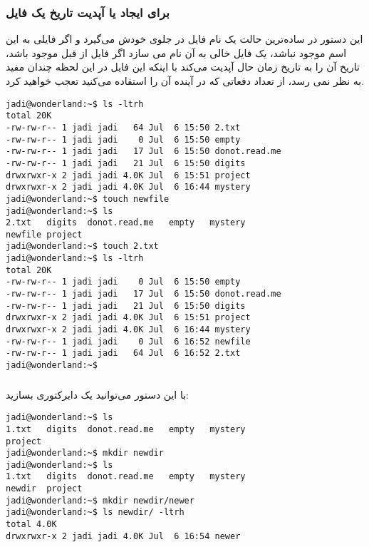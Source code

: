 \subsubsection*{ برای ایجاد یا آپدیت تاریخ یک فایل}
این دستور در ساده‌ترین حالت یک نام فایل در جلوی خودش می‌گیرد و
اگر فایلی به این اسم موجود نباشد، یک فایل خالی به آن نام می سازد
اگر فایل از قبل موجود باشد، تاریخ آن را به تاریخ زمان حال آپدیت می‌کند
با اینکه این فایل در این لحظه چندان مفید به نظر نمی رسد، از تعداد دفعاتی که در آینده آن را استفاده می‌کنید تعجب خواهید کرد.
\begin{frameng}
\begin{lstlisting}
jadi@wonderland:~$ ls -ltrh
total 20K
-rw-rw-r-- 1 jadi jadi   64 Jul  6 15:50 2.txt
-rw-rw-r-- 1 jadi jadi    0 Jul  6 15:50 empty
-rw-rw-r-- 1 jadi jadi   17 Jul  6 15:50 donot.read.me
-rw-rw-r-- 1 jadi jadi   21 Jul  6 15:50 digits
drwxrwxr-x 2 jadi jadi 4.0K Jul  6 15:51 project
drwxrwxr-x 2 jadi jadi 4.0K Jul  6 16:44 mystery
jadi@wonderland:~$ touch newfile
jadi@wonderland:~$ ls
2.txt	digits	donot.read.me	empty	mystery
newfile	project
jadi@wonderland:~$ touch 2.txt 
jadi@wonderland:~$ ls -ltrh
total 20K
-rw-rw-r-- 1 jadi jadi    0 Jul  6 15:50 empty
-rw-rw-r-- 1 jadi jadi   17 Jul  6 15:50 donot.read.me
-rw-rw-r-- 1 jadi jadi   21 Jul  6 15:50 digits
drwxrwxr-x 2 jadi jadi 4.0K Jul  6 15:51 project
drwxrwxr-x 2 jadi jadi 4.0K Jul  6 16:44 mystery
-rw-rw-r-- 1 jadi jadi    0 Jul  6 16:52 newfile
-rw-rw-r-- 1 jadi jadi   64 Jul  6 16:52 2.txt
jadi@wonderland:~$ 
\end{lstlisting}
\end{frameng}

\subsubsection*{}
با این دستور می‌توانید یک دایرکتوری بسازید:
\begin{frameng}
\begin{lstlisting}
jadi@wonderland:~$ ls
1.txt	digits	donot.read.me	empty	mystery
project
jadi@wonderland:~$ mkdir newdir
jadi@wonderland:~$ ls
1.txt	digits	donot.read.me	empty	mystery
newdir	project
jadi@wonderland:~$ mkdir newdir/newer
jadi@wonderland:~$ ls newdir/ -ltrh
total 4.0K
drwxrwxr-x 2 jadi jadi 4.0K Jul  6 16:54 newer
\end{lstlisting}
\end{frameng}

